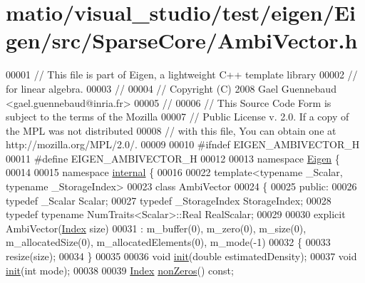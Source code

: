 \hypertarget{matio_2visual__studio_2test_2eigen_2_eigen_2src_2_sparse_core_2_ambi_vector_8h_source}{}\section{matio/visual\+\_\+studio/test/eigen/\+Eigen/src/\+Sparse\+Core/\+Ambi\+Vector.h}
\label{matio_2visual__studio_2test_2eigen_2_eigen_2src_2_sparse_core_2_ambi_vector_8h_source}

\begin{DoxyCode}
00001 \textcolor{comment}{// This file is part of Eigen, a lightweight C++ template library}
00002 \textcolor{comment}{// for linear algebra.}
00003 \textcolor{comment}{//}
00004 \textcolor{comment}{// Copyright (C) 2008 Gael Guennebaud <gael.guennebaud@inria.fr>}
00005 \textcolor{comment}{//}
00006 \textcolor{comment}{// This Source Code Form is subject to the terms of the Mozilla}
00007 \textcolor{comment}{// Public License v. 2.0. If a copy of the MPL was not distributed}
00008 \textcolor{comment}{// with this file, You can obtain one at http://mozilla.org/MPL/2.0/.}
00009 
00010 \textcolor{preprocessor}{#ifndef EIGEN\_AMBIVECTOR\_H}
00011 \textcolor{preprocessor}{#define EIGEN\_AMBIVECTOR\_H}
00012 
00013 \textcolor{keyword}{namespace }\hyperlink{namespace_eigen}{Eigen} \{ 
00014 
00015 \textcolor{keyword}{namespace }\hyperlink{namespaceinternal}{internal} \{
00016 
00022 \textcolor{keyword}{template}<\textcolor{keyword}{typename} \_Scalar, \textcolor{keyword}{typename} \_StorageIndex>
00023 \textcolor{keyword}{class }AmbiVector
00024 \{
00025   \textcolor{keyword}{public}:
00026     \textcolor{keyword}{typedef} \_Scalar Scalar;
00027     \textcolor{keyword}{typedef} \_StorageIndex StorageIndex;
00028     \textcolor{keyword}{typedef} \textcolor{keyword}{typename} NumTraits<Scalar>::Real RealScalar;
00029 
00030     \textcolor{keyword}{explicit} AmbiVector(\hyperlink{namespace_eigen_a62e77e0933482dafde8fe197d9a2cfde}{Index} size)
00031       : m\_buffer(0), m\_zero(0), m\_size(0), m\_allocatedSize(0), m\_allocatedElements(0), m\_mode(-1)
00032     \{
00033       resize(size);
00034     \}
00035 
00036     \textcolor{keywordtype}{void} \hyperlink{structinit}{init}(\textcolor{keywordtype}{double} estimatedDensity);
00037     \textcolor{keywordtype}{void} \hyperlink{structinit}{init}(\textcolor{keywordtype}{int} mode);
00038 
00039     \hyperlink{namespace_eigen_a62e77e0933482dafde8fe197d9a2cfde}{Index} \hyperlink{class_eigen_1_1internal_1_1_ambi_vector_ae0b137e95f52dea2320c16c379d27e74}{nonZeros}() \textcolor{keyword}{const};

\end{DoxyCode}
